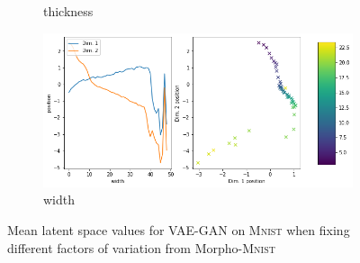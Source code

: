 \documentclass[11pt,a4paper]{article}
\begin{document}
\begin{figure}[H]
\begin{subfigure}{.48\textwidth}
\caption{thickness}
\end{subfigure}
\begin{subfigure}{.48\textwidth}
\includegraphics[width=\textwidth]{images/latent_space_traversals/vae_gan_mnist_morpho_latent_space_values_width.png}
\caption{width}
\end{subfigure}
\caption{Mean latent space values for \ac{VAE}-\ac{GAN} on \textsc{Mnist} when fixing different factors of variation from Morpho-\textsc{Mnist}}
\label{fig:vae_gan_mnist_morpho_latent_space_values}
\end{figure}
\end{document}
